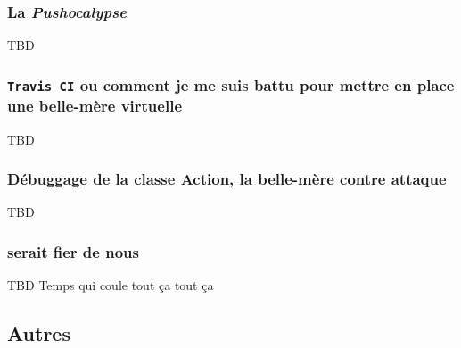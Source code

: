\documentclass{article}
\newcommand{\info}{\texttt}
\begin{document}
        \subsubsection{La \emph{Pushocalypse}}
        
        TBD
        
        \subsubsection{\info{Travis CI} ou comment je me suis battu pour mettre en place une belle-mère virtuelle}
        
        TBD
        
        \subsubsection{Débuggage de la classe Action, la belle-mère contre attaque}
        
        TBD
        
        \subsubsection{ serait fier de nous}
        
        TBD Temps qui coule tout ça tout ça
    
    
    \subsection{Autres}
\end{document}
